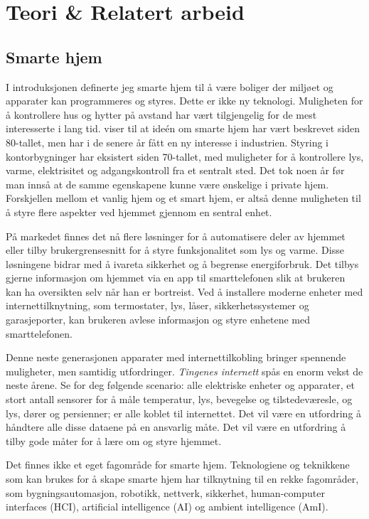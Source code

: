 \section[Teori \& Relatert arbeid]{Teori \& Relatert arbeid}
\subsection{Smarte hjem}
\label{ch:smartehjem}
I introduksjonen definerte jeg smarte hjem til å være boliger der miljøet og apparater kan programmeres og styres. Dette er ikke ny teknologi. Muligheten for å kontrollere hus og hytter på avstand har vært tilgjengelig for de mest interesserte i lang tid. \citet{peine08} viser til at ideén om smarte hjem har vært beskrevet siden 80-tallet, men har i de senere år fått en ny interesse i industrien. Styring i kontorbygninger har eksistert siden 70-tallet, med muligheter for å kontrollere lys, varme, elektrisitet og adgangskontroll fra et sentralt sted. Det tok noen år før man innså at de samme egenskapene kunne være ønskelige i private hjem. Forskjellen mellom et vanlig hjem og et smart hjem, er altså denne muligheten til å styre flere aspekter ved hjemmet gjennom en sentral enhet.

På markedet finnes det nå flere løsninger for å automatisere deler av hjemmet eller tilby brukergrensesnitt for å styre funksjonalitet som lys og varme. Disse løsningene bidrar med å ivareta sikkerhet og å begrense energiforbruk. Det tilbys gjerne informasjon om hjemmet via en app til smarttelefonen slik at brukeren kan ha oversikten selv når han er bortreist. Ved å installere moderne enheter med internettilknytning, som termostater, lys, låser, sikkerhetssystemer og garasjeporter, kan brukeren avlese informasjon og styre enhetene med smarttelefonen.

Denne neste generasjonen apparater med internettilkobling bringer spennende muligheter, men samtidig utfordringer. \emph{Tingenes internett} spås en enorm vekst de neste årene. Se for deg følgende scenario: alle elektriske enheter og apparater, et stort antall sensorer for å måle temperatur, lys, bevegelse og tilstedeværesle, og lys, dører og persienner; er alle koblet til internettet. Det vil være en utfordring å håndtere alle disse dataene på en ansvarlig måte. Det vil være en utfordring å tilby gode måter for å lære om og styre hjemmet.

Det finnes ikke et eget fagområde for smarte hjem. Teknologiene og teknikkene som kan brukes for å skape smarte hjem har tilknytning til en rekke fagområder, som bygningsautomasjon, robotikk, nettverk, sikkerhet, human-computer interfaces (HCI), artificial intelligence (AI) og ambient intelligence (AmI).

